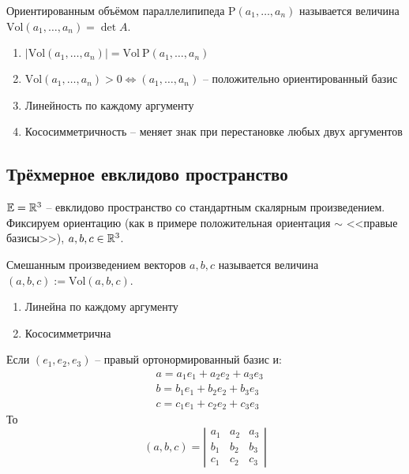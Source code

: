 \begin{Def}
  Ориентированным объёмом параллелипипеда $\mathrm{P}(a_1, \ldots, a_n)$ называется величина $\mathrm{Vol}(a_1, \ldots, a_n) = \det A$.
  \begin{Properties}\leavevmode
    \begin{enumerate}
      \item $|\mathrm{Vol}(a_1, \ldots, a_n)| = \mathrm{Vol\ P}(a_1, \ldots, a_n)$
      \item $\mathrm{Vol}(a_1, \ldots, a_n) > 0 \iff (a_1, \ldots, a_n)$ -- положительно ориентированный базис
      \item Линейность по каждому аргументу
      \item Кососимметричность -- меняет знак при перестановке любых двух аргументов
    \end{enumerate}
  \end{Properties}
\end{Def}

\subsection*{Трёхмерное евклидово пространство}
%
$\mathbb{E} = \mathbb{R}^3$ -- евклидово пространство со стандартным скалярным произведением. Фиксируем ориентацию (как в примере положительная ориентация $\sim$ <<правые базисы>>), $a, b, c \in \mathbb{R}^3$.

\begin{Def}
  Смешанным произведением векторов $a, b, c$ называется величина $(a, b, c) := \mathrm{Vol}(a, b, c)$.
\end{Def}

\begin{Properties}\leavevmode
  \begin{enumerate}
    \item Линейна по каждому аргументу
    \item Кососимметрична
  \end{enumerate}
\end{Properties}

Если $(e_1, e_2, e_3)$ -- правый ортонормированный базис и:
\begin{align}
  &a = a_1 e_1 + a_2 e_2 + a_3 e_3\\
  &b = b_1 e_1 + b_2 e_2 + b_3 e_3\\
  &c = c_1 e_1 + c_2 e_2 + c_3 e_3
\end{align}
То
\[
(a, b, c) = \left| \begin{array}{ccc}
  a_1 & a_2 & a_3 \\
  b_1 & b_2 & b_3 \\
  c_1 & c_2 & c_3
  \end{array}\right|
\]


